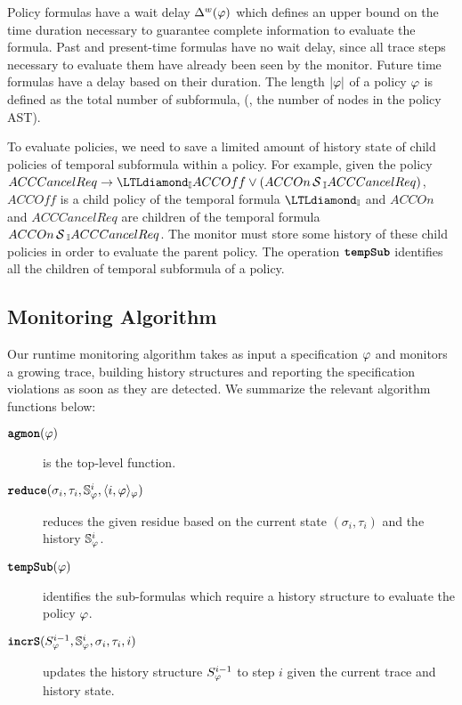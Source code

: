 Policy formulas have a wait delay $\Delta^w(\varphi)$ which defines an upper bound on the time duration necessary to guarantee complete information to evaluate the formula. Past and present-time formulas have no wait delay, since all trace steps necessary to evaluate them have already been seen by the monitor. Future time formulas have a delay based on their duration. The length $|\varphi|$ of a policy $\varphi$ is defined as the total number of subformula, (\ie, the number of nodes in the policy AST).

To evaluate \planguage policies, we need to save a limited amount of history state of child policies of temporal subformula within a policy. For example, given the policy $ACCCancelReq \rightarrow \eventually_{\interval} ACCOff \vee (ACCOn \since_{\interval} ACCCancelReq)$, $ACCOff$ is a child policy of the temporal formula $\eventually_{\interval}$ and $ACCOn$ and $ACCCancelReq$ are children of the temporal formula $ACCOn \,\mathrm{\cal S}\,_{\mathbb{I}} ACCCancelReq$. The monitor must store some history of these child policies in order to evaluate the parent policy.
The operation $\textbf{\texttt{tempSub}}$ identifies all the children of temporal subformula of a policy.




\subsection{Monitoring Algorithm}
Our runtime monitoring algorithm \monitor takes as input a specification $\varphi$ and monitors a growing trace, building history structures and reporting the specification violations as soon as they are detected. We summarize the relevant algorithm functions below:

\begin{description}
\item[$\textbf{\texttt{agmon}}{}(\varphi)$] is the top-level function. 
\item[$\textbf{\texttt{reduce}}(\sigma_i, \tau_i, \mathbb{S}^{i}_{\varphi}, \langle i, \varphi \rangle_{\varphi})$] reduces the given residue based on the current state $(\sigma_i,\tau_i)$ and the history $\mathbb{S}^{i}_{\varphi}$.
\item[$\textbf{\texttt{tempSub}}(\varphi)$] identifies the sub-formulas which require a history structure to evaluate the policy $\varphi$.
\item[$\textbf{\texttt{incrS}}({S}^{i-1}_{\varphi}, \mathbb{S}^{i}_{\varphi}, \sigma_i, \tau_i, i)$] updates the history structure ${S}^{i-1}_{\varphi}$ to step $i$ given the current trace and history state.
\end{description}




